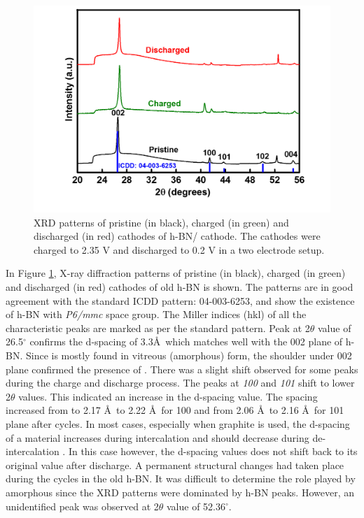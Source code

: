 \begin{figure}[tbh!]
\centering
\includegraphics[width=\textwidth]{Figures/BOhBN/hBNXRD2}
\caption{XRD patterns of pristine (in black), charged (in green) and discharged (in red) cathodes of h-BN/ cathode. The cathodes were charged to 2.35 V and discharged to 0.2 V in a two electrode setup.}
\label{Figures/BOhBN:hBNXRD2}
\end{figure}

In Figure \ref{Figures/BOhBN:hBNXRD2}, X-ray diffraction patterns of pristine (in black), charged (in green) and discharged (in red) cathodes of old h-BN is shown. The patterns are in good agreement with the standard ICDD pattern: 04-003-6253, and show the existence of h-BN with \textit{P6/mmc} space group. The Miller indices (hkl) of all the characteristic peaks are marked as per the standard pattern. Peak at 2$\theta$ value of 26.5$^{\circ}$ confirms the d-spacing of 3.3\AA\, which matches well with the 002 plane of h-BN. Since  is mostly found in vitreous (amorphous) form, the shoulder under 002 plane confirmed the presence of . There was a slight shift observed for some peaks during the charge and discharge process. The peaks at \textit{100} and \textit{101} shift to lower 2$\theta$ values. This indicated an increase in the d-spacing value. The spacing increased from to 2.17 \AA\ to 2.22 \AA\ for 100 and from 2.06 \AA\ to 2.16 \AA\ for 101 plane after cycles. In most cases, especially when graphite is used, the d-spacing of a material increases during intercalation and should decrease during de-intercalation \cite{wang_advanced_2017, rani_fluorinated_2013}. In this case however, the d-spacing values does not shift back to its original value after discharge. A permanent structural changes had taken place during the cycles in the old h-BN. It was difficult to determine the role played by amorphous  since the XRD patterns were dominated by h-BN peaks. However, an unidentified peak was observed at 2$\theta$ value of 52.36$^{\circ}$. 
 
